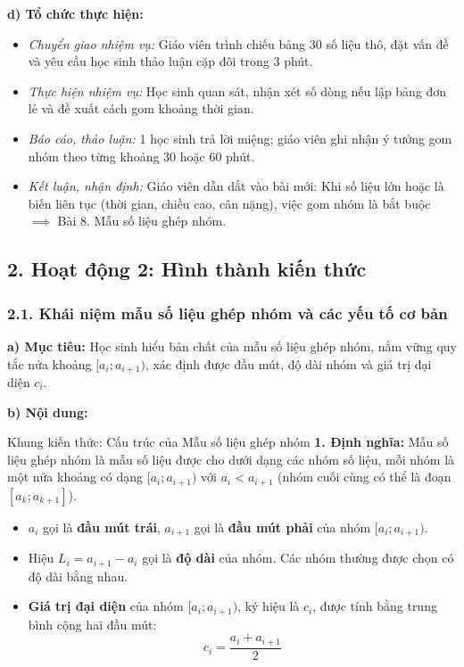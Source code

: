 \documentclass[12pt, a4paper]{article}
\begin{document}
\noindent \textbf{d) Tổ chức thực hiện:}
\begin{itemize}[leftmargin=0.8cm]
    \item \textit{Chuyển giao nhiệm vụ:} Giáo viên trình chiếu bảng 30 số liệu thô, đặt vấn đề và yêu cầu học sinh thảo luận cặp đôi trong 3 phút.
    \item \textit{Thực hiện nhiệm vụ:} Học sinh quan sát, nhận xét số dòng nếu lập bảng đơn lẻ và đề xuất cách gom khoảng thời gian.
    \item \textit{Báo cáo, thảo luận:} 1 học sinh trả lời miệng; giáo viên ghi nhận ý tưởng gom nhóm theo từng khoảng 30 hoặc 60 phút.
    \item \textit{Kết luận, nhận định:} Giáo viên dẫn dắt vào bài mới: Khi số liệu lớn hoặc là biến liên tục (thời gian, chiều cao, cân nặng), việc gom nhóm là bắt buộc $\implies$ Bài 8. Mẫu số liệu ghép nhóm.
\end{itemize}

\subsection*{2. Hoạt động 2: Hình thành kiến thức}

\subsubsection*{2.1. Khái niệm mẫu số liệu ghép nhóm và các yếu tố cơ bản}

\noindent \textbf{a) Mục tiêu:}
Học sinh hiểu bản chất của mẫu số liệu ghép nhóm, nắm vững quy tắc nửa khoảng $[a_i; a_{i+1})$, xác định được đầu mút, độ dài nhóm và giá trị đại diện $c_i$.

\noindent \textbf{b) Nội dung:}
\begin{pedabox}{Khung kiến thức: Cấu trúc của Mẫu số liệu ghép nhóm}
\textbf{1. Định nghĩa:} Mẫu số liệu ghép nhóm là mẫu số liệu được cho dưới dạng các nhóm số liệu, mỗi nhóm là một nửa khoảng có dạng $[a_i; a_{i+1})$ với $a_i < a_{i+1}$ (nhóm cuối cùng có thể là đoạn $[a_k; a_{k+1}]$).
\begin{itemize}[leftmargin=0.6cm]
    \item $a_i$ gọi là \textbf{đầu mút trái}, $a_{i+1}$ gọi là \textbf{đầu mút phải} của nhóm $[a_i; a_{i+1})$.
    \item Hiệu $L_i = a_{i+1} - a_i$ gọi là \textbf{độ dài} của nhóm. Các nhóm thường được chọn có độ dài bằng nhau.
    \item \textbf{Giá trị đại diện} của nhóm $[a_i; a_{i+1})$, ký hiệu là $c_i$, được tính bằng trung bình cộng hai đầu mút:
    $$c_i = \dfrac{a_i + a_{i+1}}{2}$$
\end{itemize}
\end{pedabox}
\end{document}
